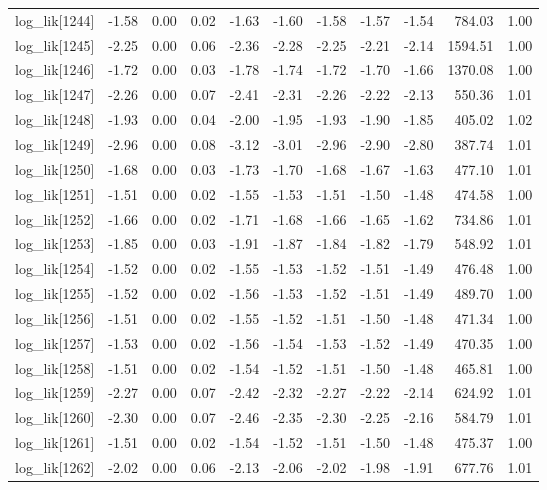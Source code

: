 \begin{table}[ht]
\begin{tabular}{rrrrrrrrrrr}
  log\_lik[1244] & -1.58 & 0.00 & 0.02 & -1.63 & -1.60 & -1.58 & -1.57 & -1.54 & 784.03 & 1.00 \\ 
  log\_lik[1245] & -2.25 & 0.00 & 0.06 & -2.36 & -2.28 & -2.25 & -2.21 & -2.14 & 1594.51 & 1.00 \\ 
  log\_lik[1246] & -1.72 & 0.00 & 0.03 & -1.78 & -1.74 & -1.72 & -1.70 & -1.66 & 1370.08 & 1.00 \\ 
  log\_lik[1247] & -2.26 & 0.00 & 0.07 & -2.41 & -2.31 & -2.26 & -2.22 & -2.13 & 550.36 & 1.01 \\ 
  log\_lik[1248] & -1.93 & 0.00 & 0.04 & -2.00 & -1.95 & -1.93 & -1.90 & -1.85 & 405.02 & 1.02 \\ 
  log\_lik[1249] & -2.96 & 0.00 & 0.08 & -3.12 & -3.01 & -2.96 & -2.90 & -2.80 & 387.74 & 1.01 \\ 
  log\_lik[1250] & -1.68 & 0.00 & 0.03 & -1.73 & -1.70 & -1.68 & -1.67 & -1.63 & 477.10 & 1.01 \\ 
  log\_lik[1251] & -1.51 & 0.00 & 0.02 & -1.55 & -1.53 & -1.51 & -1.50 & -1.48 & 474.58 & 1.00 \\ 
  log\_lik[1252] & -1.66 & 0.00 & 0.02 & -1.71 & -1.68 & -1.66 & -1.65 & -1.62 & 734.86 & 1.01 \\ 
  log\_lik[1253] & -1.85 & 0.00 & 0.03 & -1.91 & -1.87 & -1.84 & -1.82 & -1.79 & 548.92 & 1.01 \\ 
  log\_lik[1254] & -1.52 & 0.00 & 0.02 & -1.55 & -1.53 & -1.52 & -1.51 & -1.49 & 476.48 & 1.00 \\ 
  log\_lik[1255] & -1.52 & 0.00 & 0.02 & -1.56 & -1.53 & -1.52 & -1.51 & -1.49 & 489.70 & 1.00 \\ 
  log\_lik[1256] & -1.51 & 0.00 & 0.02 & -1.55 & -1.52 & -1.51 & -1.50 & -1.48 & 471.34 & 1.00 \\ 
  log\_lik[1257] & -1.53 & 0.00 & 0.02 & -1.56 & -1.54 & -1.53 & -1.52 & -1.49 & 470.35 & 1.00 \\ 
  log\_lik[1258] & -1.51 & 0.00 & 0.02 & -1.54 & -1.52 & -1.51 & -1.50 & -1.48 & 465.81 & 1.00 \\ 
  log\_lik[1259] & -2.27 & 0.00 & 0.07 & -2.42 & -2.32 & -2.27 & -2.22 & -2.14 & 624.92 & 1.01 \\ 
  log\_lik[1260] & -2.30 & 0.00 & 0.07 & -2.46 & -2.35 & -2.30 & -2.25 & -2.16 & 584.79 & 1.01 \\ 
  log\_lik[1261] & -1.51 & 0.00 & 0.02 & -1.54 & -1.52 & -1.51 & -1.50 & -1.48 & 475.37 & 1.00 \\ 
  log\_lik[1262] & -2.02 & 0.00 & 0.06 & -2.13 & -2.06 & -2.02 & -1.98 & -1.91 & 677.76 & 1.01 \\ 

\end{tabular}
\end{table}
